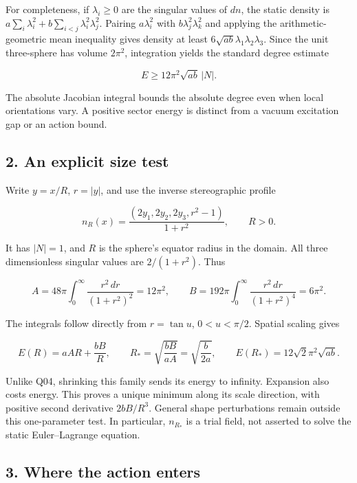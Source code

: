 \documentclass[11pt,a4paper]{article}
\begin{document}
For completeness, if \(\lambda_i\ge0\) are the singular values of
\(dn\), the static density is
\(a\sum_i\lambda_i^2+b\sum_{i<j}\lambda_i^2\lambda_j^2\). Pairing
\(a\lambda_i^2\) with \(b\lambda_j^2\lambda_k^2\) and applying the
arithmetic-geometric mean inequality gives density at least
\(6\sqrt{ab}\lambda_1\lambda_2\lambda_3\). Since the unit three-sphere
has volume \(2\pi^2\), integration yields the standard degree estimate

\[E\ge12\pi^2\sqrt{ab}\,|N|. \tag{3}\]

The absolute Jacobian integral bounds the absolute degree even when
local orientations vary. A positive sector energy is distinct from a
vacuum excitation gap or an action bound.

\hypertarget{an-explicit-size-test}{%
\subsection{2. An explicit size test}\label{an-explicit-size-test}}

Write \(y=x/R\), \(r=|y|\), and use the inverse stereographic profile

\[n_R(x)=\frac{(2y_1,2y_2,2y_3,r^2-1)}{1+r^2},\qquad R>0.\]

It has \(|N|=1\), and \(R\) is the sphere's equator radius in the
domain. All three dimensionless singular values are \(2/(1+r^2)\). Thus

\[A=48\pi\int_0^\infty\frac{r^2\,dr}{(1+r^2)^2}=12\pi^2,
\qquad
B=192\pi\int_0^\infty\frac{r^2\,dr}{(1+r^2)^4}=6\pi^2.\]

The integrals follow directly from \(r=\tan u\), \(0<u<\pi/2\). Spatial
scaling gives

\[E(R)=aAR+\frac{bB}{R},\qquad
R_* =\sqrt{\frac{bB}{aA}}=\sqrt{\frac{b}{2a}},\qquad
E(R_*)=12\sqrt2\pi^2\sqrt{ab}. \tag{4}\]

Unlike Q04, shrinking this family sends its energy to infinity.
Expansion also costs energy. This proves a unique minimum along its
scale direction, with positive second derivative \(2bB/R^3\). General
shape perturbations remain outside this one-parameter test. In
particular, \(n_{R_*}\) is a trial field, not asserted to solve the
static Euler--Lagrange equation.

\hypertarget{where-the-action-enters}{%
\subsection{3. Where the action enters}\label{where-the-action-enters}}
\end{document}
